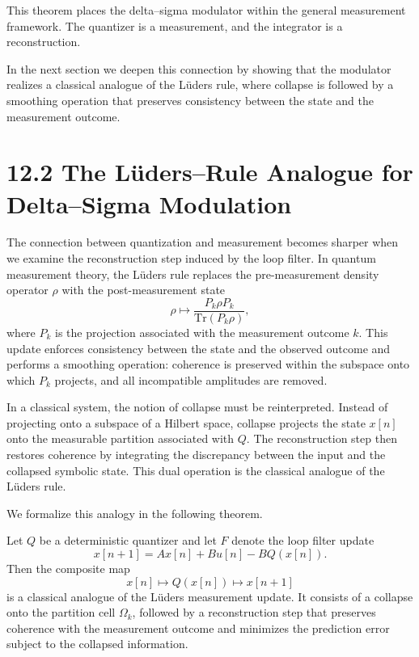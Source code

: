 \noindent
This theorem places the delta--sigma modulator within the general measurement framework. The quantizer is a measurement, and the integrator is a reconstruction.

In the next section we deepen this connection by showing that the modulator realizes a classical analogue of the Lüders rule, where collapse is followed by a smoothing operation that preserves consistency between the state and the measurement outcome.

\section*{12.2 The Lüders–Rule Analogue for Delta--Sigma Modulation}

The connection between quantization and measurement becomes sharper when we examine the reconstruction step induced by the loop filter. In quantum measurement theory, the Lüders rule \cite{vonneumann1932foundations} replaces the pre-measurement density operator $\rho$ with the post-measurement state
\[
\rho \longmapsto \frac{P_{k} \rho P_{k}}{\mathrm{Tr}(P_{k} \rho)},
\]
where $P_{k}$ is the projection associated with the measurement outcome $k$. This update enforces consistency between the state and the observed outcome and performs a smoothing operation: coherence is preserved within the subspace onto which $P_{k}$ projects, and all incompatible amplitudes are removed.

In a classical system, the notion of collapse must be reinterpreted. Instead of projecting onto a subspace of a Hilbert space, collapse projects the state $x[n]$ onto the measurable partition associated with $Q$. The reconstruction step then restores coherence by integrating the discrepancy between the input and the collapsed symbolic state. This dual operation is the classical analogue of the Lüders rule.

We formalize this analogy in the following theorem.

\begin{theorem}
Let $Q$ be a deterministic quantizer and let $F$ denote the loop filter update
\[
x[n+1] = A x[n] + B u[n] - B Q(x[n]).
\]
Then the composite map
\[
x[n] \longmapsto Q(x[n]) \longmapsto x[n+1]
\]
is a classical analogue of the Lüders measurement update. It consists of a collapse onto the partition cell $\Omega_{k}$, followed by a reconstruction step that preserves coherence with the measurement outcome and minimizes the prediction error subject to the collapsed information.
\end{theorem}

